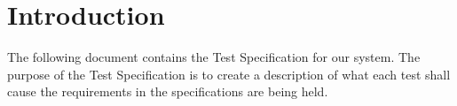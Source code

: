 \section{Introduction}
The following document contains the Test Specification for our system. The purpose of the Test Specification is to create a description of what each test shall cause the requirements in the specifications are being held.